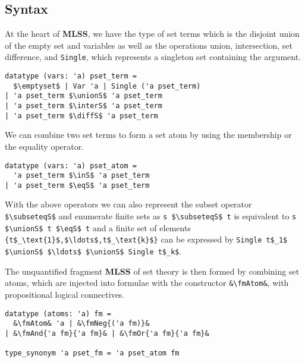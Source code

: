 \documentclass[sigplan,10pt,anonymous,review]{acmart}
\newcommand{\MLSS}{\textbf{MLSS}}
\newcommand{\unionS}{\sqcup_\text{s}}
\newcommand{\interS}{\sqcap_\text{s}}
\newcommand{\diffS}{-_\text{s}}
\newcommand{\inS}{\in_\text{s}}
\newcommand{\eqS}{=_\text{s}}
\newcommand{\subseteqS}{\sqsubseteq_\text{s}}
\newcommand{\fmAnd}[2]{#1 $\boldsymbol{\land}$ #2}
\newcommand{\fmOr}[2]{#1 $\boldsymbol{\lor}$ #2}
\newcommand{\fmNegSymbol}{\boldsymbol{\neg}}
\newcommand{\fmNeg}[1]{$\fmNegSymbol$ #1}
\newcommand{\fmAtom}{\textbf{A}}
\begin{document}
\subsection{Syntax}
At the heart of \MLSS{}, we have the type of set terms which is the disjoint union of the empty set and variables as well as the operations union, intersection, set difference, and \lstinline!Single!, which represents a singleton set containing the argument.
\begin{lstlisting}
datatype (vars: 'a) pset_term =
  $\emptyset$ | Var 'a | Single ('a pset_term)
| 'a pset_term $\unionS$ 'a pset_term
| 'a pset_term $\interS$ 'a pset_term
| 'a pset_term $\diffS$ 'a pset_term
\end{lstlisting}
We can combine two set terms to form a set atom by using the membership or the equality operator.
\begin{lstlisting}
datatype (vars: 'a) pset_atom =
  'a pset_term $\inS$ 'a pset_term
| 'a pset_term $\eqS$ 'a pset_term
\end{lstlisting}
With the above operators we can also represent the subset operator \lstinline!$\subseteqS$! and enumerate finite sets as \lstinline!s $\subseteqS$ t! is equivalent to \lstinline!s $\unionS$ t $\eqS$ t! and a finite set of elements \lstinline!{t$_\text{1}$,$\ldots$,t$_\text{k}$}! can be expressed by \lstinline!Single t$_1$ $\unionS$ $\ldots$ $\unionS$ Single t$_k$!.

The unquantified fragment \MLSS{} of set theory is then formed by combining set atoms, which are injected into formulae with the constructor \lstinline!&\fmAtom&!, with propositional logical connectives.
\begin{lstlisting}
datatype (atoms: 'a) fm =
  &\fmAtom& 'a | &\fmNeg{('a fm)}&
| &\fmAnd{'a fm}{'a fm}& | &\fmOr{'a fm}{'a fm}&

type_synonym 'a pset_fm = 'a pset_atom fm
\end{lstlisting}
\end{document}
